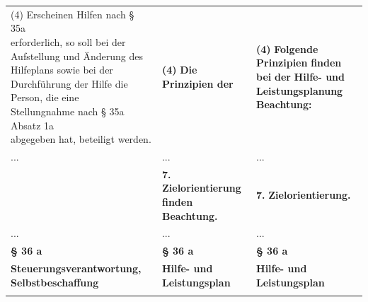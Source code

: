 \documentclass[10pt,a4paper,landscape]{article}
\begin{document}
\begin{longtable}{|L{8.2cm}|L{8.2cm}|L{8.2cm}|}
(4) \textcolor{diffred}{Erscheinen Hilfen nach \S{} 35a  \newline erforderlich, so soll} bei der \textcolor{diffred}{Aufstellung} und  \newline \textcolor{diffred}{Änderung des Hilfeplans sowie bei der  \newline Durchführung der Hilfe die Person, die eine  \newline Stellungnahme nach \S{} 35a Absatz 1a  \newline abgegeben hat, beteiligt werden.} & \textbf{(4) }\textbf{\textcolor{diffred}{Die}}\textbf{ Prinzipien der} & \textbf{(4) }\textbf{\textcolor{diffgreen}{Folgende}}\textbf{ Prinzipien }\textbf{\textcolor{diffgreen}{finden bei}}\textbf{ der} \newline \textbf{\textcolor{diffgreen}{Hilfe- und Leistungsplanung Beachtung:}} \\
\hhline{|---|}
... & ... & ... \\
\hhline{|---|}
 & \textbf{7.} \newline \textbf{\textcolor{diffred}{Zielorientierung finden Beachtung.}} & \textbf{7.} \newline \textbf{\textcolor{diffgreen}{Zielorientierung.}} \\
\hhline{|---|}
... & ... & ... \\
\hhline{|---|}
\textbf{\S{} 36 a} & \textbf{\S{} 36 a} & \textbf{\S{} 36 a} \\
\hhline{|---|}
\textbf{\textcolor{diffred}{Steuerungsverantwortung,  \newline Selbstbeschaffung}} & \textbf{Hilfe- und Leistungsplan } & \textbf{Hilfe- und Leistungsplan } \\
\hhline{|---|}

\end{longtable}
\end{document}
